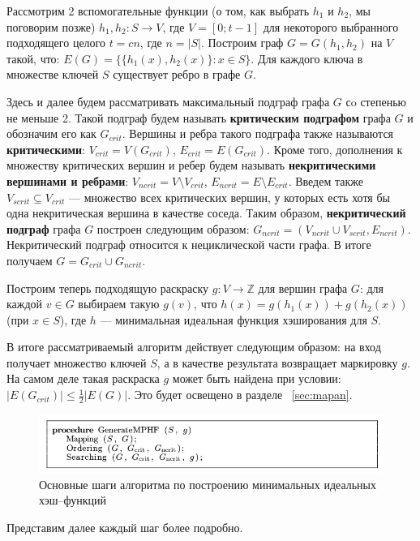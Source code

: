 \documentclass[specialist,
               substylefile = spbu.rtx,
               subf,href,colorlinks=true, 12pt]{disser}
\begin{document}
Рассмотрим 2 вспомогательные функции (о том, как выбрать $h_1$ и $h_2$, мы поговорим позже) $h_1, h_2 : S \longrightarrow V$, где $V = [0; t-1]$ для некоторого выбранного подходящего целого $t = cn$, где $n = |S|$. Построим граф $G = G(h_1, h_2)$ на $V$ такой, что: $E(G) = \{\{h_1(x),h_2(x)\}: x \in S\}$. Для каждого ключа в множестве ключей $S$ существует ребро в графе $G$.

Здесь и далее будем рассматривать максимальный подграф графа $G$ сo степенью не меньше 2. Такой подграф будем называть \textbf{критическим подграфом} графа $G$ и обозначим его как $G_{crit}$. Вершины и ребра такого подграфа также называются \textbf{критическими}: $V_{crit} = V(G_{crit})$, $E_{crit} = E(G_{crit})$. Кроме того, дополнения к множеству критических вершин и ребер будем называть \textbf{некритическими вершинами и ребрами}: $V_{ncrit} = V \setminus V_{crit}$, $E_{ncrit} = E \setminus E_{crit}$. Введем также $V_{scrit} \subseteq V_{crit}$ --- множество всех критических вершин, у которых есть хотя бы одна некритическая вершина в качестве соседа. Таким образом, \textbf{некритический подграф} графа $G$ построен следующим образом: $G_{ncrit} = (V_{ncrit} \cup V_{scrit}, E_{ncrit})$. Некритический подграф относится к нециклической части графа. В итоге получаем $G = G_{crit} \cup G_{ncrit}$.

Построим теперь подходящую раскраску $g : V \longrightarrow \mathbb{Z}$ для вершин графа $G$: для каждой $v \in G$ выбираем такую $g(v)$, что $h(x) = g(h_1(x)) + g(h_2(x))$ (при $x \in S$), где $h$ --- минимальная идеальная функция хэширования для $S$.

В итоге рассматриваемый алгоритм действует следующим образом: на вход получает множество ключей $S$, а в качестве результата возвращает маркировку $g$. На самом деле такая раскраска $g$ может быть найдена при условии: $|E(G_{crit})| \leq \frac{1}{2}|E(G)|$. Это будет освещено в разделе ~\ref{sec:mapan}.

\begin{figure}[h]
\begin{center}
\includegraphics[scale=0.5]{imgs/proc.jpg}
\caption{Основные шаги алгоритма по построению минимальных идеальных хэш--функций}
\end{center}
\end{figure}
Представим далее каждый шаг более подробно.
\end{document}

